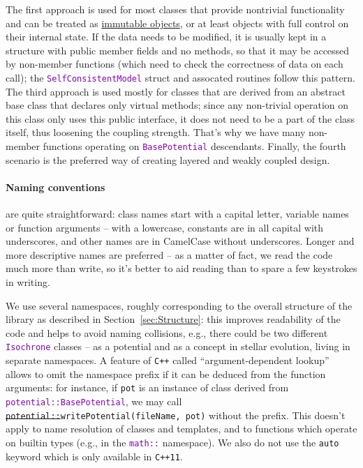 \documentclass[12pt]{article}
\newcommand{\Cpp}  {\texttt{C++}\xspace}
\newcommand{\CppII}{\texttt{C++11}\xspace}
\newcommand{\ttt}[1]{\textcolor{darkviolet}{\texttt{#1}}}
\let\oldparagraph\paragraph
\renewcommand{\paragraph}[1]{\vspace{-2mm}\oldparagraph{#1}}
\begin{document}
The first approach is used for most classes that provide nontrivial functionality and can be treated as \hyperref[sec:Const]{immutable objects}, or at least objects with full control on their internal state. If the data needs to be modified, it is usually kept in a structure with public member fields and no methods, so that it may be accessed by non-member functions (which need to check the correctness of data on each call); the \ttt{SelfConsistentModel} struct and assocated routines follow this pattern. The third approach is used mostly for classes that are derived from an abstract base class that declares only virtual methods; since any non-trivial operation on this class only uses this public interface, it does not need to be a part of the class itself, thus loosening the coupling strength. That's why we have many non-member functions operating on \ttt{BasePotential} descendants. Finally, the fourth scenario is the preferred way of creating layered and weakly coupled design.

\paragraph{Naming conventions}  are quite straightforward: class names start with a capital letter, variable names or function arguments -- with a lowercase, constants are in all capital with underscores, and other names are in CamelCase without underscores. Longer and more descriptive names are preferred -- as a matter of fact, we read the code much more than write, so it's better to aid reading than to spare a few keystrokes in writing.

We use several namespaces, roughly corresponding to the overall structure of the library as described in Section~\ref{sec:Structure}: this improves readability of the code and helps to avoid naming collisions, e.g., there could be two different \ttt{Isochrone} classes -- as a potential and as a concept in stellar evolution, living in separate namespaces. A feature of \Cpp called ``argument-dependent lookup'' allows to omit the namespace prefix if it can be deduced from the function arguments: for instance, if \texttt{pot} is an instance of class derived from \ttt{potential::BasePotential}, we may call \texttt{\sout{potential::}writePotential(fileName, pot)} without the prefix. This doesn't apply to name resolution of classes and templates, and to functions which operate on builtin types (e.g., in the \ttt{math::} namespace). We also do not use the \texttt{auto} keyword which is only available in \CppII.
\end{document}
